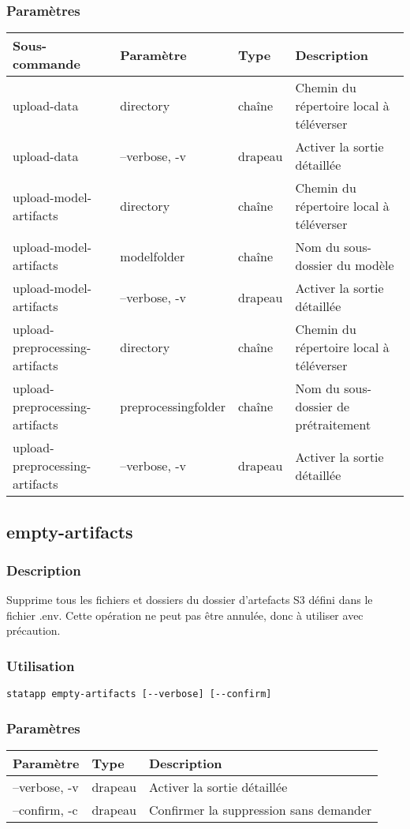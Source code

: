 \documentclass{article}
\begin{document}
\subsubsection{Paramètres}
\begin{tabulary}{\linewidth}{LLLL}
\toprule
\textbf{Sous-commande} & \textbf{Paramètre} & \textbf{Type} & \textbf{Description} \\
\midrule
upload-data & directory & chaîne & Chemin du répertoire local à téléverser \\
upload-data & --verbose, -v & drapeau & Activer la sortie détaillée \\
\midrule
upload-model-artifacts & directory & chaîne & Chemin du répertoire local à téléverser \\
upload-model-artifacts & modelfolder & chaîne & Nom du sous-dossier du modèle \\
upload-model-artifacts & --verbose, -v & drapeau & Activer la sortie détaillée \\
\midrule
upload-preprocessing-artifacts & directory & chaîne & Chemin du répertoire local à téléverser \\
upload-preprocessing-artifacts & preprocessingfolder & chaîne & Nom du sous-dossier de prétraitement \\
upload-preprocessing-artifacts & --verbose, -v & drapeau & Activer la sortie détaillée \\
\bottomrule
\end{tabulary}

\subsection{empty-artifacts}
\subsubsection{Description}
Supprime tous les fichiers et dossiers du dossier d'artefacts S3 défini dans le fichier .env. Cette opération ne peut pas être annulée, donc à utiliser avec précaution.

\subsubsection{Utilisation}
\begin{lstlisting}
statapp empty-artifacts [--verbose] [--confirm]
\end{lstlisting}

\subsubsection{Paramètres}
\begin{tabulary}{\linewidth}{LLL}
\toprule
\textbf{Paramètre} & \textbf{Type} & \textbf{Description} \\
\midrule
--verbose, -v & drapeau & Activer la sortie détaillée \\
--confirm, -c & drapeau & Confirmer la suppression sans demander \\
\bottomrule
\end{tabulary}
\end{document}
